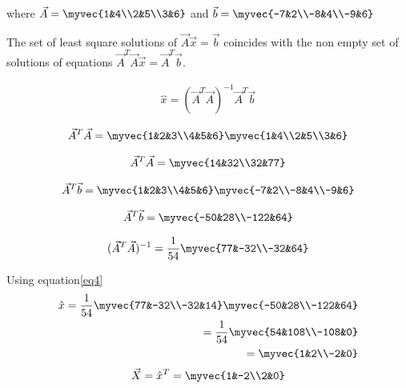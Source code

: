 \documentclass[journal,12pt,twocolumn]{IEEEtran}
\begin{document}
where $\vec{A}=\myvec{1&4\\2&5\\3&6}$ and $\vec{b}=\myvec{-7&2\\-8&4\\-9&6}$

The set of least square solutions of $\vec{A}\vec{x}=\vec{b}$ coincides with the non empty set of solutions of equations $\vec{A}^T\vec{A}\vec{x}=\vec{A}^T\vec{b}.$ 

\begin{align}\label{eq4}
 \hat{x}=(\vec{A}^T\vec{A})^{-1}\vec{A}^T\vec{b} 
\end{align}

\begin{align*}
\vec{A}^T\vec{A}=\myvec{1&2&3\\4&5&6}\myvec{1&4\\2&5\\3&6}
\end{align*}

\begin{align*}
\vec{A}^T\vec{A}=\myvec{14&32\\32&77}
\end{align*}

\begin{align*}
\vec{A}^T\vec{b}=\myvec{1&2&3\\4&5&6}\myvec{-7&2\\-8&4\\-9&6}   
\end{align*}

\begin{align*}
\vec{A}^T\vec{b}=\myvec{-50&28\\-122&64}
\end{align*}

\begin{align*}
(\vec{A}^T\vec{A})^{-1}=\frac{1}{54}\myvec{77&-32\\-32&64} 
\end{align*}

Using equation\eqref{eq4} 
\begin{align*}
\hat{x}=\frac{1}{54}\myvec{77&-32\\-32&14}\myvec{-50&28\\-122&64}\\
=\frac{1}{54}\myvec{54&108\\-108&0}\\
=\myvec{1&2\\-2&0}
\end{align*}
\begin{align*}
\vec{X}=\hat{x}^T=\myvec{1&-2\\2&0}  
\end{align*}
\end{document}
